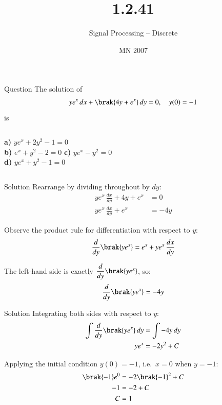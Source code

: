 \documentclass{beamer}
\begin{document}
\title{1.2.41}
\date{MN 2007}
\author{Signal Processing -- Discrete}

\frame{\titlepage}

\begin{frame}{Question}
The solution of
\begin{align}
    ye^x\,dx + \brak{4y + e^x}\,dy = 0, \quad y(0) = -1
\end{align}
is
\vspace{0.3cm}
\begin{columns}
    \textbf{a)} $ye^x + 2y^2 - 1 = 0$\\[0.4cm]
    \textbf{b)} $e^x + y^2 - 2 = 0$
    \textbf{c)} $ye^x - y^2 = 0$\\[0.4cm]
    \textbf{d)} $ye^x + y^2 - 1 = 0$
\end{columns}
\end{frame}

\begin{frame}{Solution}
Rearrange by dividing throughout by $dy$:
\begin{align}
    ye^x\,\frac{dx}{dy} + 4y + e^x &= 0 \\
    ye^x\,\frac{dx}{dy} + e^x &= -4y
\end{align}

Observe the product rule for differentiation with respect to $y$:
\begin{align}
    \frac{d}{dy}\brak{ye^x} = e^x + ye^x\,\frac{dx}{dy} \label{eq:prod}
\end{align}

The left-hand side is exactly $\dfrac{d}{dy}\brak{ye^x}$, so:
\begin{align}
    \frac{d}{dy}\brak{ye^x} = -4y
\end{align}
\end{frame}

\begin{frame}{Solution}
Integrating both sides with respect to $y$:
\begin{align}
    \int \frac{d}{dy}\brak{ye^x}\,dy &= \int -4y\,dy \\
    ye^x &= -2y^2 + C \label{eq:gen}
\end{align}

Applying the initial condition $y(0) = -1$, i.e.\ $x=0$ when $y=-1$:
\begin{align}
    \brak{-1}e^{0} &= -2\brak{-1}^2 + C \\
    -1 &= -2 + C \\
    C &= 1
\end{align}
\end{frame}
\end{document}
